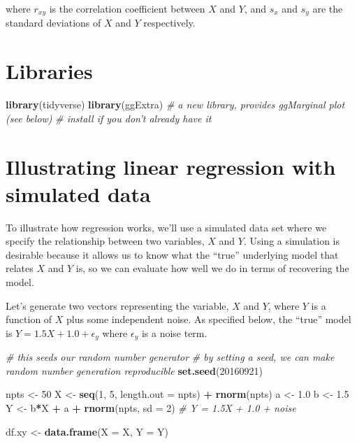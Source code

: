 \documentclass[]{book}
\newenvironment{Shaded}{\begin{snugshade}}{\end{snugshade}}
\newcommand{\CommentTok}[1]{\textcolor[rgb]{0.56,0.35,0.01}{\textit{#1}}}
\newcommand{\DataTypeTok}[1]{\textcolor[rgb]{0.13,0.29,0.53}{#1}}
\newcommand{\DecValTok}[1]{\textcolor[rgb]{0.00,0.00,0.81}{#1}}
\newcommand{\FloatTok}[1]{\textcolor[rgb]{0.00,0.00,0.81}{#1}}
\newcommand{\KeywordTok}[1]{\textcolor[rgb]{0.13,0.29,0.53}{\textbf{#1}}}
\newcommand{\NormalTok}[1]{#1}
\newcommand{\OperatorTok}[1]{\textcolor[rgb]{0.81,0.36,0.00}{\textbf{#1}}}
\newcommand{\StringTok}[1]{\textcolor[rgb]{0.31,0.60,0.02}{#1}}
\theoremstyle{definition}
\theoremstyle{definition}
\theoremstyle{definition}
\theoremstyle{remark}
\begin{document}
where \(r_{xy}\) is the correlation coefficient between \(X\) and \(Y\),
and \(s_x\) and \(s_y\) are the standard deviations of \(X\) and \(Y\)
respectively.

\hypertarget{libraries-7}{%
\section{Libraries}\label{libraries-7}}

\begin{Shaded}
\begin{Highlighting}[]
\KeywordTok{library}\NormalTok{(tidyverse)}
\KeywordTok{library}\NormalTok{(ggExtra)  }\CommentTok{# a new library, provides ggMarginal plot (see below)}
                  \CommentTok{# install if you don't already have it}
\end{Highlighting}
\end{Shaded}

\hypertarget{illustrating-linear-regression-with-simulated-data}{%
\section{Illustrating linear regression with simulated
data}\label{illustrating-linear-regression-with-simulated-data}}

To illustrate how regression works, we'll use a simulated data set where
we specify the relationship between two variables, \(X\) and \(Y\).
Using a simulation is desirable because it allows us to know what the
``true'' underlying model that relates \(X\) and \(Y\) is, so we can
evaluate how well we do in terms of recovering the model.

Let's generate two vectors representing the variable, \(X\) and \(Y\),
where \(Y\) is a function of \(X\) plus some independent noise. As
specified below, the ``true'' model is \(Y = 1.5X + 1.0 + \epsilon_y\)
where \(\epsilon_y\) is a noise term.

\begin{Shaded}
\begin{Highlighting}[]
\CommentTok{# this seeds our random number generator}
\CommentTok{# by setting a seed, we can make random number generation reproducible}
\KeywordTok{set.seed}\NormalTok{(}\DecValTok{20160921}\NormalTok{)  }

\NormalTok{npts <-}\StringTok{ }\DecValTok{50}
\NormalTok{X <-}\StringTok{ }\KeywordTok{seq}\NormalTok{(}\DecValTok{1}\NormalTok{, }\DecValTok{5}\NormalTok{, }\DataTypeTok{length.out =}\NormalTok{ npts) }\OperatorTok{+}\StringTok{ }\KeywordTok{rnorm}\NormalTok{(npts)}
\NormalTok{a <-}\StringTok{ }\FloatTok{1.0}
\NormalTok{b <-}\StringTok{ }\FloatTok{1.5}
\NormalTok{Y <-}\StringTok{ }\NormalTok{b}\OperatorTok{*}\NormalTok{X }\OperatorTok{+}\StringTok{ }\NormalTok{a }\OperatorTok{+}\StringTok{ }\KeywordTok{rnorm}\NormalTok{(npts, }\DataTypeTok{sd =} \DecValTok{2}\NormalTok{)  }\CommentTok{# Y = 1.5X + 1.0 + noise}

\NormalTok{df.xy <-}\StringTok{ }\KeywordTok{data.frame}\NormalTok{(}\DataTypeTok{X =}\NormalTok{ X, }\DataTypeTok{Y =}\NormalTok{ Y)}
\end{Highlighting}
\end{Shaded}
\end{document}
